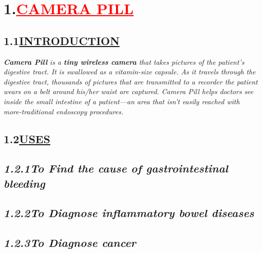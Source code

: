 \documentclass[12pt]{article}
\begin{document}
\section*{\textbf{1.\hspace{1cm}\textcolor{red}{\underline{\huge{CAMERA PILL}}}}}
\vspace{1cm}
\subsection*{\hspace{1cm}\textbf{1.1\hspace{1cm}\underline{\LARGE{INTRODUCTION}}}}
\hspace{1cm}\large{\emph{\textbf{Camera Pill} is a \textbf{tiny wireless camera} that takes pictures of the patient's digestive tract. It is swallowed as a vitamin-size capsule. As it travels through the digestive tract, thousands of pictures that are transmitted to a recorder the patient wears on a belt around his/her waist are captured. Camera Pill helps doctors see inside the small intestine of a patient—an area that isn't easily reached with more-traditional endoscopy procedures.}}
\vspace{2cm}
\subsection*{\hspace{1cm}\textbf{\huge{1.2\hspace{1cm}\underline{USES}}}}

\subsection*{\hspace{1cm}\emph{\large{1.2.1\hspace{1cm}To Find the cause of gastrointestinal bleeding}}}

\subsection*{\hspace{1cm}\emph{\large{1.2.2\hspace{1cm}To Diagnose inflammatory bowel diseases}}}
\subsection*{\hspace{1cm}\emph{\large{1.2.3\hspace{1cm}To Diagnose cancer}}}
\newpage
\end{document}
